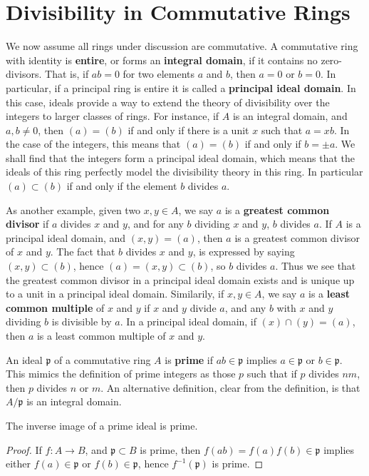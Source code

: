 \chapter{Divisibility in Commutative Rings}

We now assume all rings under discussion are commutative. A commutative ring with identity is {\bf entire}, or forms an {\bf integral domain}, if it contains no zero-divisors. That is, if $ab = 0$ for two elements $a$ and $b$, then $a = 0$ or $b = 0$. In particular, if a principal ring is entire it is called a {\bf principal ideal domain}. In this case, ideals provide a way to extend the theory of divisibility over the integers to larger classes of rings. For instance, if $A$ is an integral domain, and $a,b \neq 0$, then $(a) = (b)$ if and only if there is a unit $x$ such that $a = xb$. In the case of the integers, this means that $(a) = (b)$ if and only if $b = \pm a$. We shall find that the integers form a principal ideal domain, which means that the ideals of this ring perfectly model the divisibility theory in this ring. In particular $(a) \subset (b)$ if and only if the element $b$ divides $a$.

As another example, given two $x,y \in A$, we say $a$ is a {\bf greatest common divisor} if $a$ divides $x$ and $y$, and for any $b$ dividing $x$ and $y$, $b$ divides $a$. If $A$ is a principal ideal domain, and $(x,y) = (a)$, then $a$ is a greatest common divisor of $x$ and $y$. The fact that $b$ divides $x$ and $y$, is expressed by saying $(x,y) \subset (b)$, hence $(a) = (x,y) \subset (b)$, so $b$ divides $a$. Thus we see that the greatest common divisor in a principal ideal domain exists and is unique up to a unit in a principal ideal domain. Similarily, if $x,y \in A$, we say $a$ is a {\bf least common multiple} of $x$ and $y$ if $x$ and $y$ divide $a$, and any $b$ with $x$ and $y$ dividing $b$ is divisible by $a$. In a principal ideal domain, if $(x) \cap (y) = (a)$, then $a$ is a least common multiple of $x$ and $y$.

An ideal $\mathfrak{p}$ of a commutative ring $A$ is {\bf prime} if $ab \in \mathfrak{p}$ implies $a \in \mathfrak{p}$ or $b \in \mathfrak{p}$. This mimics the definition of prime integers as those $p$ such that if $p$ divides $nm$, then $p$ divides $n$ or $m$. An alternative definition, clear from the definition, is that $A/\mathfrak{p}$ is an integral domain.

\begin{theorem}
    The inverse image of a prime ideal is prime.
\end{theorem}
\begin{proof}
    If $f: A \to B$, and $\mathfrak{p} \subset B$ is prime, then $f(ab) = f(a)f(b) \in \mathfrak{p}$ implies either $f(a) \in \mathfrak{p}$ or $f(b) \in \mathfrak{p}$, hence $f^{-1}(\mathfrak{p})$ is prime.
\end{proof}

